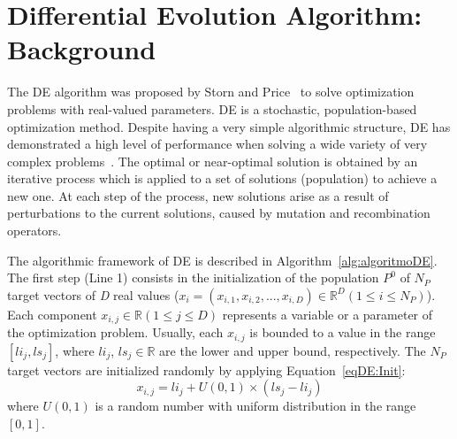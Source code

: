 \section{Differential Evolution Algorithm: Background}
\label{sec:DE}
\vspace{-0.4cm}
The DE algorithm was proposed by Storn and Price~\cite{Storn1997} to solve optimization problems with real-valued parameters. DE is a stochastic, population-based  optimization method. Despite having a very simple algorithmic structure, DE has demonstrated a high level of performance when solving a wide variety of very complex problems~\cite{Price:2005}. The optimal or near-optimal solution is obtained by an iterative process which is applied to a set of solutions (population) to achieve a new one. At each step of the process, new solutions arise as a result of perturbations to the current solutions, caused by mutation and recombination operators. %

The algorithmic framework of DE is described in Algorithm~\ref{alg:algoritmoDE}. The first step (Line 1) consists in the initialization of the population $P^0$ of $N_P$ target vectors of \textit{D} real values ($x_i = (x_{i,1}, x_{i,2}, . . . , x_{i,D}) \in \mathbb{R}^{D}  (1 \leq i \leq N_P)$). Each component $x_{i,j} \in \mathbb{R} (1 \leq j \leq D)$ represents a variable or a parameter of the optimization problem. Usually, each $x_{i,j}$ is bounded to a value in the range $[li_j, ls_j]$, where $li_j$, $ls_j \in \mathbb{R}$ are the lower and upper bound, respectively. The $N_P$ target vectors are initialized randomly by applying Equation~\ref{eqDE:Init}:
\vspace{-0.2cm}
\begin{equation}\label{eqDE:Init}
x_{i,j} = li_{j} + U(0, 1) \times (ls_j - li_j)
\end{equation}
\noindent where $U(0, 1)$ is a random number with uniform distribution in the range $[0, 1]$. 

